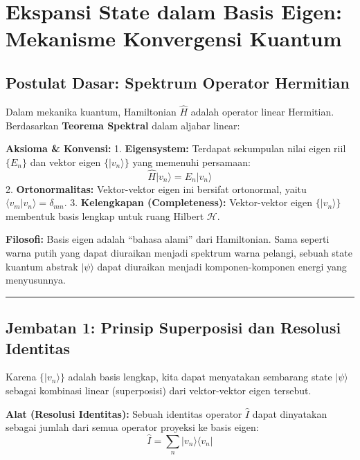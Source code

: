 \section{Ekspansi State dalam Basis Eigen: Mekanisme Konvergensi Kuantum}\label{appendix-g}


\hypertarget{postulat-dasar-spektrum-operator-hermitian}{%
\subsection{Postulat Dasar: Spektrum Operator Hermitian}\label{postulat-dasar-spektrum-operator-hermitian}}

Dalam mekanika kuantum, Hamiltonian \(\hat{H}\) adalah operator linear Hermitian. Berdasarkan \textbf{Teorema Spektral} dalam aljabar linear:

\textbf{Aksioma \& Konvensi:} 1. \textbf{Eigensystem:} Terdapat sekumpulan nilai eigen riil \(\{E_n\}\) dan vektor eigen \(\{|v_n\rangle\}\) yang memenuhi persamaan: \[ \hat{H} |v_n\rangle = E_n |v_n\rangle \] 2. \textbf{Ortonormalitas:} Vektor-vektor eigen ini bersifat ortonormal, yaitu \(\langle v_m | v_n \rangle = \delta_{mn}\). 3. \textbf{Kelengkapan (Completeness):} Vektor-vektor eigen \(\{|v_n\rangle\}\) membentuk basis lengkap untuk ruang Hilbert \(\mathcal{H}\).

\textbf{Filosofi:} Basis eigen adalah ``bahasa alami'' dari Hamiltonian. Sama seperti warna putih yang dapat diuraikan menjadi spektrum warna pelangi, sebuah state kuantum abstrak \(|\psi\rangle\) dapat diuraikan menjadi komponen-komponen energi yang menyusunnya.

\begin{center}\rule{0.5\linewidth}{0.5pt}\end{center}

\hypertarget{jembatan-1-prinsip-superposisi-dan-resolusi-identitas}{%
\subsection{Jembatan 1: Prinsip Superposisi dan Resolusi Identitas}\label{jembatan-1-prinsip-superposisi-dan-resolusi-identitas}}

Karena \(\{|v_n\rangle\}\) adalah basis lengkap, kita dapat menyatakan sembarang state \(|\psi\rangle\) sebagai kombinasi linear (superposisi) dari vektor-vektor eigen tersebut.

\textbf{Alat (Resolusi Identitas):} Sebuah identitas operator \(\hat{I}\) dapat dinyatakan sebagai jumlah dari semua operator proyeksi ke basis eigen: \[ \hat{I} = \sum_n |v_n\rangle\langle v_n | \]

